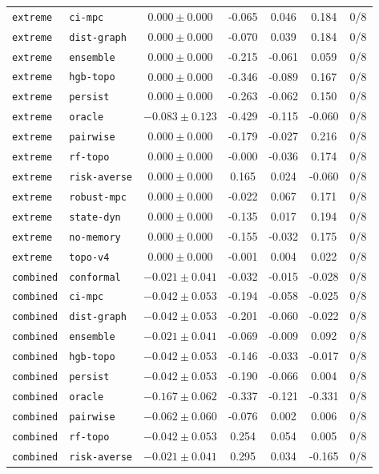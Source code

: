 \documentclass{article}
\begin{document}
\begin{center}
\begin{tabular}{llccccc}
\texttt{extreme} & \texttt{ci-mpc} & $0.000 \pm 0.000$ & -0.065 & 0.046 & 0.184 & 0/8 \\
\texttt{extreme} & \texttt{dist-graph} & $0.000 \pm 0.000$ & -0.070 & 0.039 & 0.184 & 0/8 \\
\texttt{extreme} & \texttt{ensemble} & $0.000 \pm 0.000$ & -0.215 & -0.061 & 0.059 & 0/8 \\
\texttt{extreme} & \texttt{hgb-topo} & $0.000 \pm 0.000$ & -0.346 & -0.089 & 0.167 & 0/8 \\
\texttt{extreme} & \texttt{persist} & $0.000 \pm 0.000$ & -0.263 & -0.062 & 0.150 & 0/8 \\
\texttt{extreme} & \texttt{oracle} & $-0.083 \pm 0.123$ & -0.429 & -0.115 & -0.060 & 0/8 \\
\texttt{extreme} & \texttt{pairwise} & $0.000 \pm 0.000$ & -0.179 & -0.027 & 0.216 & 0/8 \\
\texttt{extreme} & \texttt{rf-topo} & $0.000 \pm 0.000$ & -0.000 & -0.036 & 0.174 & 0/8 \\
\texttt{extreme} & \texttt{risk-averse} & $0.000 \pm 0.000$ & 0.165 & 0.024 & -0.060 & 0/8 \\
\texttt{extreme} & \texttt{robust-mpc} & $0.000 \pm 0.000$ & -0.022 & 0.067 & 0.171 & 0/8 \\
\texttt{extreme} & \texttt{state-dyn} & $0.000 \pm 0.000$ & -0.135 & 0.017 & 0.194 & 0/8 \\
\texttt{extreme} & \texttt{no-memory} & $0.000 \pm 0.000$ & -0.155 & -0.032 & 0.175 & 0/8 \\
\texttt{extreme} & \texttt{topo-v4} & $0.000 \pm 0.000$ & -0.001 & 0.004 & 0.022 & 0/8 \\
\texttt{combined} & \texttt{conformal} & $-0.021 \pm 0.041$ & -0.032 & -0.015 & -0.028 & 0/8 \\
\texttt{combined} & \texttt{ci-mpc} & $-0.042 \pm 0.053$ & -0.194 & -0.058 & -0.025 & 0/8 \\
\texttt{combined} & \texttt{dist-graph} & $-0.042 \pm 0.053$ & -0.201 & -0.060 & -0.022 & 0/8 \\
\texttt{combined} & \texttt{ensemble} & $-0.021 \pm 0.041$ & -0.069 & -0.009 & 0.092 & 0/8 \\
\texttt{combined} & \texttt{hgb-topo} & $-0.042 \pm 0.053$ & -0.146 & -0.033 & -0.017 & 0/8 \\
\texttt{combined} & \texttt{persist} & $-0.042 \pm 0.053$ & -0.190 & -0.066 & 0.004 & 0/8 \\
\texttt{combined} & \texttt{oracle} & $-0.167 \pm 0.062$ & -0.337 & -0.121 & -0.331 & 0/8 \\
\texttt{combined} & \texttt{pairwise} & $-0.062 \pm 0.060$ & -0.076 & 0.002 & 0.006 & 0/8 \\
\texttt{combined} & \texttt{rf-topo} & $-0.042 \pm 0.053$ & 0.254 & 0.054 & 0.005 & 0/8 \\
\texttt{combined} & \texttt{risk-averse} & $-0.021 \pm 0.041$ & 0.295 & 0.034 & -0.165 & 0/8 \\
\bottomrule
\end{tabular}
\end{center}
\end{document}
